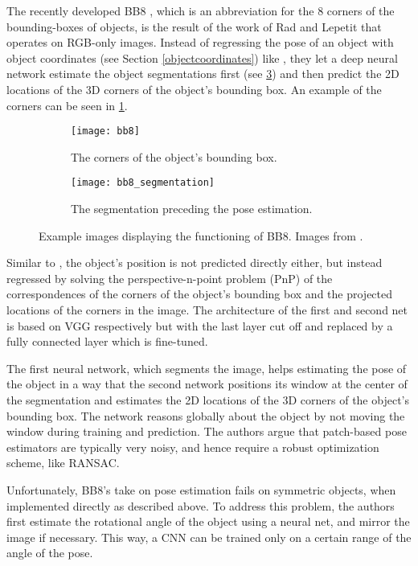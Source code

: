 The recently developed BB8 \cite{bb8}, which is an abbreviation for the 8 corners of the bounding-boxes of objects, is the result of the work of Rad and Lepetit that operates on RGB-only images. Instead of regressing the pose of an object with object coordinates (see Section \ref{objectcoordinates}) like \cite{brachmann1}, they let a deep neural network estimate the object segmentations first (see \fig \ref{fig:bb8_segmentation}) and then predict the 2D locations of the 3D corners of the object's bounding box. An example of the corners can be seen in \fig \ref{fig:bb8}.

\begin{figure}[!tbp]
	\centering
	\begin{subfigure}[b]{0.45\textwidth}
		\centering
    	\texttt{[image: bb8]}
    	\caption{The corners of the object's bounding box.}
    	\label{fig:bb8}
	\end{subfigure}
	\hfill
	\begin{subfigure}[b]{0.45\textwidth}
		\centering
    	\texttt{[image: bb8\_segmentation]}
    	\caption{The segmentation preceding the pose estimation.}
    	\label{fig:bb8_segmentation}
	\end{subfigure}
	\caption{Example images displaying the functioning of BB8. Images from \cite{bb8}.}
\end{figure} 

Similar to \cite{brachmann1}, the object's position is not predicted directly either, but instead regressed by solving the perspective-n-point problem (PnP) of the correspondences of the corners of the object's bounding box and the projected locations of the corners in the image. The architecture of the first and second net is based on VGG \cite{vgg} respectively but with the last layer cut off and replaced by a fully connected layer which is fine-tuned. 

The first neural network, which segments the image, helps estimating the pose of the object in a way that the second network positions its window at the center of the segmentation and estimates the 2D locations of the 3D corners of the object's bounding box. The network reasons globally about the object by not moving the window during training and prediction. The authors argue that patch-based pose estimators are typically very noisy, and hence require a robust optimization scheme, like RANSAC. 

Unfortunately, BB8's take on pose estimation fails on symmetric objects, when implemented directly as described above. To address this problem, the authors first estimate the rotational angle of the object using a neural net, and mirror the image if necessary. This way, a CNN can be trained only on a certain range of the angle of the pose.

